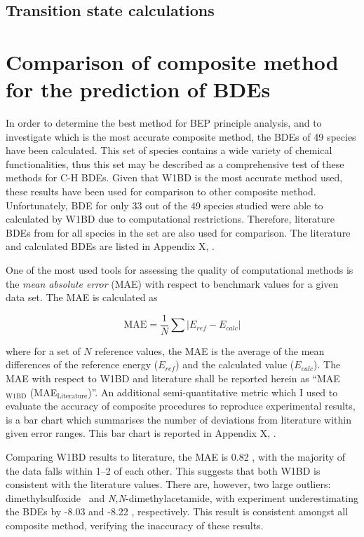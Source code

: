 \subsection{Transition state calculations}

\section{Comparison of composite method for the prediction of BDEs}

In order to determine the best method for BEP principle analysis, and to investigate which is the most accurate composite method, the BDEs of 49 species have been calculated. This set of species contains a wide variety of chemical functionalities, thus this set may be described as a comprehensive test of these methods for C-H BDEs. Given that W1BD is the most accurate method used, these results have been used for comparison to other composite method. Unfortunately, BDE for only 33 out of the 49 species studied were able to calculated by W1BD due to computational restrictions. Therefore, literature BDEs from \citet{Luo2002} for all species in the set are also used for comparison. The literature and calculated BDEs are listed in Appendix X, .

One of the most used tools for assessing the quality of computational methods is the \emph{mean absolute error} (MAE) with respect to benchmark values for a given data set.\cite{Savin2014} The MAE is calculated as

\begin{equation}
  \mathrm{MAE} = \frac{1}{N} \sum | E_{ref} - E_{calc}|
\end{equation}

\noindent where for a set of $N$ reference values, the MAE is the average of the mean differences of the reference energy ($E_{ref}$) and the calculated value ($E_{calc}$). The MAE with respect to W1BD and literature shall be reported herein as ``MAE$_{\mathrm{W1BD}}$ (MAE$_{\mathrm{Literature}}$)''. An additional semi-quantitative metric which I used to evaluate the accuracy of composite procedures to reproduce experimental results, is a bar chart which summarises the number of deviations from literature within given error ranges. This bar chart is reported in Appendix X, .

Comparing W1BD results to literature, the MAE is 0.82 \kcalmol, with the majority of the data falls within 1--2 \kcalmol of each other. This suggests that both W1BD is consistent with the literature values. There are, however, two large outliers: dimethylsulfoxide\footnotemark~ and \emph{N,N}-dimethylacetamide, with experiment underestimating the BDEs by -8.03 and -8.22 \kcalmol, respectively. This result is consistent amongst all composite method, verifying the inaccuracy of these results.

